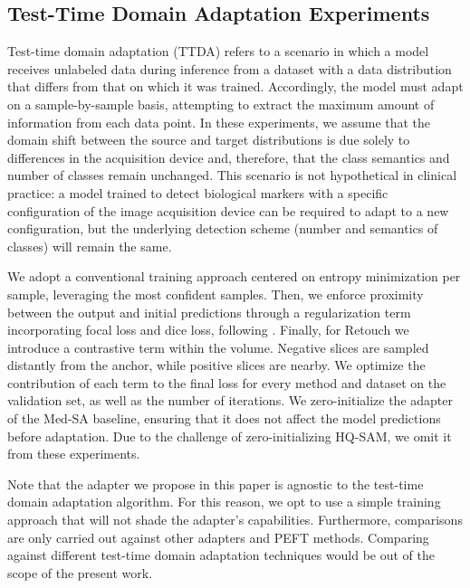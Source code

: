 \subsection{Test-Time Domain Adaptation Experiments}
Test-time domain adaptation (TTDA) refers to a scenario in which a model receives unlabeled data during inference from a dataset with a data distribution that differs from that on which it was trained. Accordingly, the model must adapt on a sample-by-sample basis, attempting to extract the maximum amount of information from each data point. In these experiments, we assume that the domain shift between the source and target distributions is due solely to differences in the acquisition device and, therefore, that the class semantics and number of classes remain unchanged. This scenario is not hypothetical in clinical practice: a model trained to detect biological markers with a specific configuration of the image acquisition device can be required to adapt to a new configuration, but the underlying detection scheme (number and semantics of classes) will remain the same.



We adopt a conventional training approach centered on entropy minimization per sample, leveraging the most confident samples. Then, we enforce proximity between the output and initial predictions through a regularization term incorporating focal loss and dice loss, following . Finally, for Retouch we introduce a contrastive term within the volume. Negative slices are sampled distantly from the anchor, while positive slices are nearby. We optimize the contribution of each term to the final loss for every method and dataset on the validation set, as well as the number of iterations. We zero-initialize the adapter of the Med-SA baseline, ensuring that it does not affect the model predictions before adaptation. Due to the challenge of zero-initializing HQ-SAM, we omit it from these experiments.

Note that the adapter we propose in this paper is agnostic to the test-time domain adaptation algorithm. For this reason, we opt to use a simple training approach that will not shade the adapter's capabilities. Furthermore, comparisons are only carried out against other adapters and PEFT methods. Comparing against different test-time domain adaptation techniques would be out of the scope of the present work.